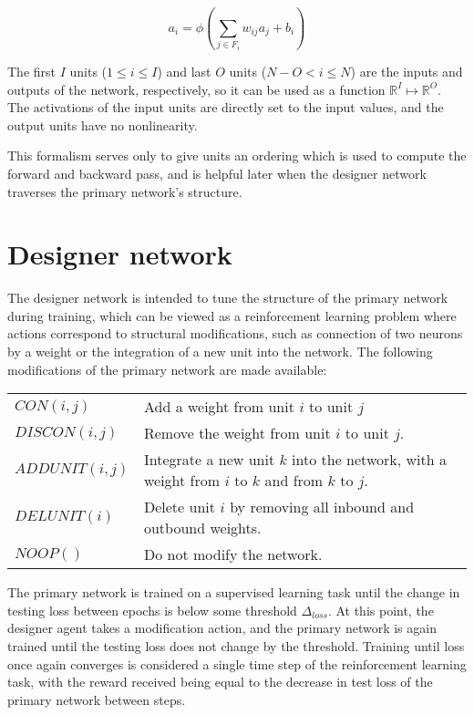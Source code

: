 \documentclass{article}[12px]
\begin{document}
\begin{equation}
a_i = \phi(\sum_{j \in F_i}{w_{ij}a_{j}} + b_i)
\end{equation}

The first \(I\) units (\(1 \le i \le I\)) and last \(O\) units (\(N - O < i \le N\)) are the inputs and outputs of the network, respectively, so it can be used as a function \(\mathbb{R}^I \mapsto \mathbb{R}^O\). The activations of the input units are directly set to the input values, and the output units have no nonlinearity.

This formalism serves only to give units an ordering which is used to compute the forward and backward pass, and is helpful later when the designer network traverses the primary network's structure.

\section{Designer network}

The designer network is intended to tune the structure of the primary network during training, which can be viewed as a reinforcement learning problem where actions correspond to structural modifications, such as connection of two neurons by a weight or the integration of a new unit into the network. The following modifications of the primary network are made available:

\begin{center}
  \begin{tabular}{| l | p{7cm} |}
    \hline
    \(CON(i, j)\) & Add a weight from unit \(i\) to unit \(j\) \\
    \(DISCON(i, j)\) & Remove the weight from unit \(i\) to unit \(j\). \\
    \(ADDUNIT(i, j)\) & Integrate a new unit \(k\) into the network, with a weight from \(i\) to \(k\) and from \(k\) to \(j\). \\
    \(DELUNIT(i)\) & Delete unit \(i\) by removing all inbound and outbound weights. \\
    \(NOOP()\) & Do not modify the network. \\
    \hline
  \end{tabular}
\end{center}

The primary network is trained on a supervised learning task until the change in testing loss between epochs is below some threshold \(\Delta_{loss}\). At this point, the designer agent takes a modification action, and the primary network is again trained until the testing loss does not change by the threshold. Training until loss once again converges is considered a single time step of the reinforcement learning task, with the reward received being equal to the decrease in test loss of the primary network between steps.
\end{document}
